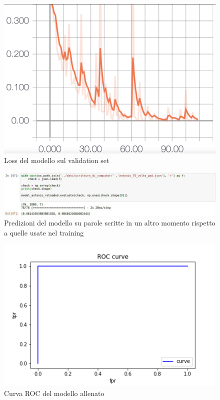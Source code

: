 \documentclass[8pt,notitlepage]{report}
\begin{document}
			\begin{figure}[H]
				\begin{center}
					\includegraphics[scale=.1865]{val_loss_Antonio}
					\caption{Loss del modello sul validation set}
				\end{center}
			\end{figure}
			
			\begin{figure}
				\begin{center}
					\includegraphics[scale=.5]{test_Antonio}
					\caption{Predizioni del modello su parole scritte in un altro momento rispetto a quelle usate nel training}
					\label{fig:prediction}
				\end{center}
			\end{figure}
			
			\newpage
			
			\begin{figure}[H]
				\begin{center}
					\includegraphics[scale=.5]{ROC_LSTM_Antonio}
					\caption{Curva ROC del modello allenato}
				\end{center}
			\end{figure}
			
\end{document}
